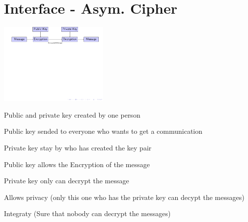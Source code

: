 \section{Interface - Asym. Cipher}

\begin{frame}

\includegraphics[trim=0.5cm 5cm 14cm 0cm, height=4cm]{figures/asym_cipher.pdf}


\begin{itemize}
  \small{
  \item Public and private key created by one person
  \item Public key sended to everyone who wants to get a communication
  \item Private key stay by who has created the key pair
  \item Public key allows the Encryption of the message
  \item Private key only can decrypt the message
  \item Allows privacy (only this one who has the private key can decypt the
  messages)
  \item Integraty (Sure that nobody can decrypt the messages)
  }
\end{itemize}



\end{frame}
